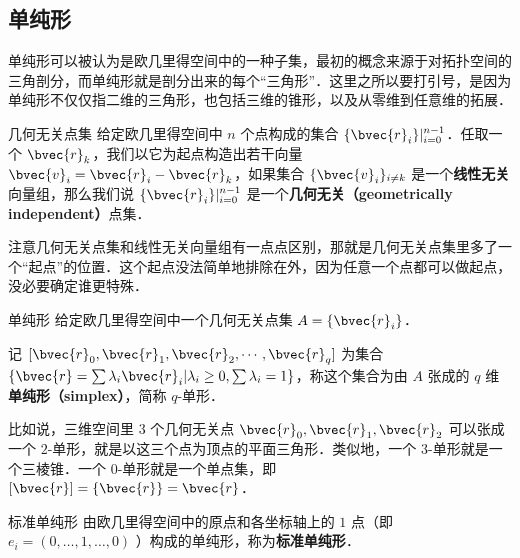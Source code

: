 
\begin{issues}
\end{issues}



\subsection{单纯形}

单纯形可以被认为是欧几里得空间中的一种子集，最初的概念来源于对拓扑空间的三角剖分，而单纯形就是剖分出来的每个“三角形”．这里之所以要打引号，是因为单纯形不仅仅指二维的三角形，也包括三维的锥形，以及从零维到任意维的拓展．

\begin{definition}{几何无关点集}
给定欧几里得空间中 $n$ 个点构成的集合 $\{\bvec{r}_i\}|_{i=0}^{n-1}$．任取一个 $\bvec{r}_k$，我们以它为起点构造出若干向量 $\bvec{v}_i=\bvec{r}_i-\bvec{r}_k$，如果集合 $\{\bvec{v}_i\}_{i\not= k}$ 是一个\textbf{线性无关}向量组，那么我们说 $\{\bvec{r}_i\}|_{i=0}^{n-1}$ 是一个\textbf{几何无关（geometrically independent）}点集．
\end{definition}

注意几何无关点集和线性无关向量组有一点点区别，那就是几何无关点集里多了一个“起点”的位置．这个起点没法简单地排除在外，因为任意一个点都可以做起点，没必要确定谁更特殊．

\begin{definition}{单纯形}
给定欧几里得空间中一个几何无关点集 $A=\{\bvec{r}_i\}$．

记 $[\bvec{r}_0, \bvec{r}_1, \bvec{r}_2, \cdots, \bvec{r}_q]$ 为集合 $\{\bvec{r}=\sum\lambda_i\bvec{r}_i|\lambda_i\geq 0, \sum\lambda_i=1\}$，称这个集合为由 $A$ 张成的 $q$ 维\textbf{单纯形（simplex）}，简称 $q$-单形．

\end{definition}

比如说，三维空间里 $3$ 个几何无关点 $\bvec{r}_0, \bvec{r}_1, \bvec{r}_2$ 可以张成一个 $2$-单形，就是以这三个点为顶点的平面三角形．类似地，一个 $3$-单形就是一个三棱锥．一个 $0$-单形就是一个单点集，即 $[\bvec{r}]=\{\bvec{r}\}=\bvec{r}$．


\begin{definition}{标准单纯形}
由欧几里得空间中的原点和各坐标轴上的 $1$ 点（即 $e_i = (0, \dots, 1, \dots, 0)$ ）构成的单纯形，称为\textbf{标准单纯形}．
\end{definition}

